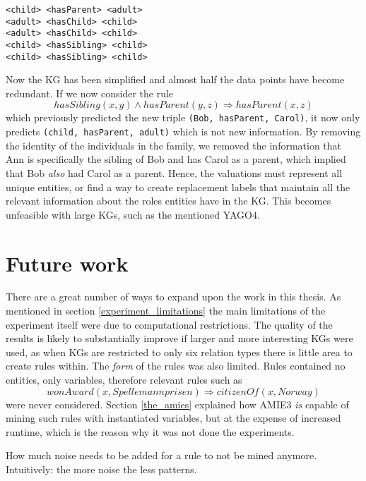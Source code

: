 \begin{example}
\begin{lstlisting}[]
<child> <hasParent> <adult>
<adult> <hasChild> <child>
<adult> <hasChild> <child>
<child> <hasSibling> <child>
<child> <hasSibling> <child>
\end{lstlisting}
\label{mini_simple_KG_rules}
\end{example}

Now the KG has been simplified and almost half the data points have become redundant. If we now consider the rule \[hasSibling(x, y) \wedge hasParent(y,z) \Rightarrow hasParent(x,z)\] which previously predicted the new triple \texttt{(Bob, hasParent, Carol)}, it now only predicts \texttt{(child, hasParent, adult)} which is not new information. By removing the identity of the individuals in the family, we removed the information that Ann is specifically the sibling of Bob and has Carol as a parent, which implied that Bob \textit{also} had Carol as a parent. Hence, the valuations must represent all unique entities, or find a way to create replacement labels that maintain all the relevant information about the roles entities have in the KG. This becomes unfeasible with large KGs, such as the mentioned YAGO4.

\section{Future work}
There are a great number of ways to expand upon the work in this thesis. As mentioned in section \ref{experiment_limitations} the main limitations of the experiment itself were due to computational restrictions. The quality of the results is likely to substantially improve if larger and more interesting KGs were used, as when KGs are restricted to only six relation types there is little area to create rules within. The \textit{form} of the rules was also limited. Rules contained no entities, only variables, therefore relevant rules such as
\[wonAward(x, Spellemannprisen) \Rightarrow citizenOf(x, Norway)\]
were never considered. Section \ref{the_amies} explained how AMIE3 \textit{is} capable of mining such rules with instantiated variables, but at the expense of increased runtime, which is the reason why it was not done the experiments.



How much noise needs to be added for a rule to not be mined anymore. Intuitively: the more noise the less patterns.